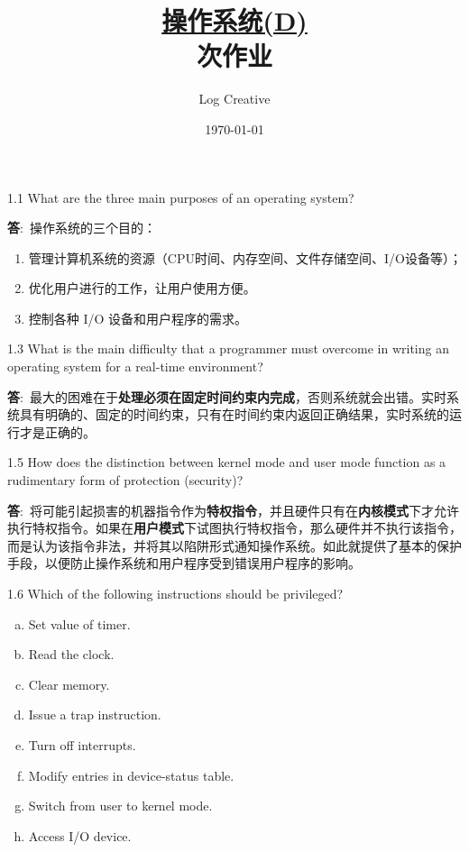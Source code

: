 \documentclass[12pt,a4paper]{article}
\newenvironment{problems}{\begin{list}{}{\renewcommand{\makelabel}[1]{\textbf{##1}\hfil}}}{\end{list}}
\providecommand{\ans}{\textbf{答}:~}
\begin{document}
\title{\normalsize \underline{操作系统(D)}\\ 次作业}
\author{Log Creative }
\date{\today}
\maketitle

\begin{problems}
    \item[1.1] What are the three main purposes of an operating system?
    
    \ans 操作系统的三个目的：
    \begin{enumerate}
        \item 管理计算机系统的资源（CPU时间、内存空间、文件存储空间、I/O设备等）；
        \item 优化用户进行的工作，让用户使用方便。
        \item 控制各种 I/O 设备和用户程序的需求。
    \end{enumerate}
    \item[1.3] What is the main difficulty that a programmer must overcome in writing
    an operating system for a real-time environment?

    \ans 最大的困难在于\textbf{处理必须在固定时间约束内完成}，否则系统就会出错。实时系统具有明确的、固定的时间约束，只有在时间约束内返回正确结果，实时系统的运行才是正确的。
    \item[1.5] How does the distinction between kernel mode and user mode function
    as a rudimentary form of protection (security)?

    \ans 将可能引起损害的机器指令作为\textbf{特权指令}，并且硬件只有在\textbf{内核模式}下才允许执行特权指令。如果在\textbf{用户模式}下试图执行特权指令，那么硬件并不执行该指令，而是认为该指令非法，并将其以陷阱形式通知操作系统。如此就提供了基本的保护手段，以便防止操作系统和用户程序受到错误用户程序的影响。
    \item[1.6] Which of the following instructions should be privileged?
    \begin{enumerate}[a.]
        \item Set value of timer.
        \item Read the clock.
        \item Clear memory.
        \item Issue a trap instruction.
        \item Turn off interrupts.
        \item Modify entries in device-status table.
        \item Switch from user to kernel mode.
        \item Access I/O device.
    \end{enumerate}


\end{problems}
\end{document}
